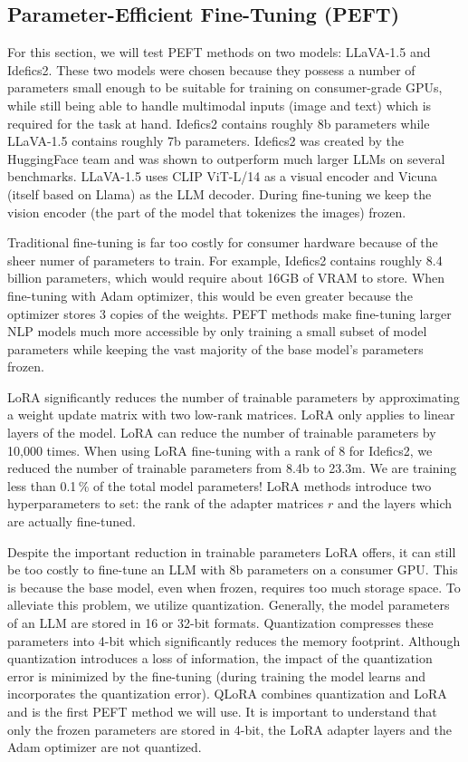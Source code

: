 \documentclass{article}
\begin{document}
\subsection{Parameter-Efficient Fine-Tuning (PEFT)}
For this section, we will test PEFT methods on two models: LLaVA-1.5\cite{liu2023llava} and Idefics2\cite{idefics2}. These
two models were chosen because they possess a number of parameters small enough to be suitable for training on consumer-grade GPUs, while still being able to handle multimodal inputs (image and text) which is required for the task at hand. Idefics2 contains roughly 8b parameters while LLaVA-1.5 contains roughly 7b parameters. Idefics2 was created by the HuggingFace team and was shown to outperform much larger LLMs on several benchmarks. LLaVA-1.5 uses CLIP ViT-L/14 as a visual encoder and Vicuna (itself based on Llama) as the LLM decoder. During fine-tuning we keep the vision encoder (the part of the model that tokenizes the images) frozen.\par

Traditional fine-tuning is far too costly for consumer hardware because of the sheer numer of parameters to train. For example, Idefics2 contains roughly 8.4 billion parameters, which would require about 16GB of VRAM to store. When fine-tuning with Adam optimizer, this would be even greater because the optimizer stores 3 copies of the weights. PEFT methods make fine-tuning larger NLP models much more accessible by only training a small subset of model parameters while keeping the vast majority of the base model's parameters frozen.\par

LoRA significantly reduces the number of trainable parameters by approximating a weight update matrix with two low-rank matrices. LoRA only applies to linear layers of the model. LoRA can reduce the number of trainable parameters by 10,000 times. When using LoRA fine-tuning with a rank of 8 for Idefics2, we reduced the number of trainable parameters from 8.4b to 23.3m. We are training less than 0.1\,\% of the total model parameters! LoRA methods introduce two hyperparameters to set: the rank of the adapter matrices $r$ and the layers which are actually fine-tuned.\par

Despite the important reduction in trainable parameters LoRA offers, it can still be too costly to fine-tune an LLM with 8b parameters on a consumer GPU. This is because the base model, even when frozen, requires too much storage space. To alleviate this problem, we utilize quantization. Generally, the model parameters of an LLM are stored in 16 or 32-bit formats. Quantization compresses these parameters into 4-bit which significantly reduces the memory footprint. Although quantization introduces a loss of information, the impact of the quantization error is minimized by the fine-tuning (during training the model learns and incorporates the quantization error). QLoRA combines quantization and LoRA and is the first PEFT method we will use. It is important to understand that only the frozen parameters are stored in 4-bit, the LoRA adapter layers and the Adam optimizer are not quantized.\par
\end{document}
